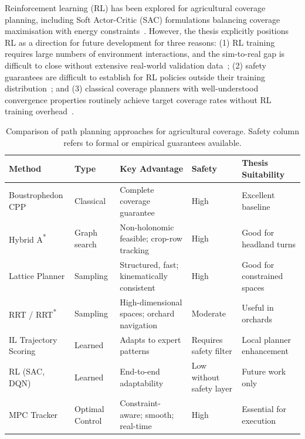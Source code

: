 \documentclass[12pt, a4paper]{article}
\begin{document}
Reinforcement learning (RL) has been explored for agricultural coverage planning, including
Soft Actor-Critic (SAC) formulations balancing coverage maximisation with energy
constraints~\cite{ref108}. However, the thesis explicitly positions RL as a direction for
future development for three reasons: (1) RL training requires large numbers of environment
interactions, and the sim-to-real gap is difficult to close without extensive real-world
validation data~\cite{ref102, ref130}; (2) safety guarantees are difficult to establish for
RL policies outside their training distribution~\cite{ref129, ref130}; and (3) classical
coverage planners with well-understood convergence properties routinely achieve target
coverage rates without RL training overhead~\cite{ref1, ref104}.

\begin{table}[htbp]
\centering
\caption{Comparison of path planning approaches for agricultural coverage. Safety column refers to formal or empirical guarantees available.}
\label{tab:planning_comparison}
\begin{tabularx}{\textwidth}{X X X X X}
\toprule
\textbf{Method} & \textbf{Type} & \textbf{Key Advantage} & \textbf{Safety} & \textbf{Thesis Suitability} \\
\midrule
Boustrophedon CPP \cite{ref138} & Classical & Complete coverage guarantee & High & Excellent baseline \\
\addlinespace
Hybrid A\textsuperscript{*} \cite{ref103, ref105, ref138} & Graph search & Non-holonomic feasible; crop-row tracking & High & Good for headland turns \\
\addlinespace
Lattice Planner \cite{ref118} & Sampling & Structured, fast; kinematically consistent & High & Good for constrained spaces \\
\addlinespace
RRT / RRT\textsuperscript{*} \cite{ref138} & Sampling & High-dimensional spaces; orchard navigation & Moderate & Useful in orchards \\
\addlinespace
IL Trajectory Scoring \cite{ref102, ref129} & Learned & Adapts to expert patterns & Requires safety filter & Local planner enhancement \\
\addlinespace
RL (SAC, DQN) \cite{ref108} & Learned & End-to-end adaptability & Low without safety layer & Future work only \\
\addlinespace
MPC Tracker \cite{ref118, ref121, ref138} & Optimal Control & Constraint-aware; smooth; real-time & High & Essential for execution \\
\bottomrule
\end{tabularx}
\end{table}
\end{document}
